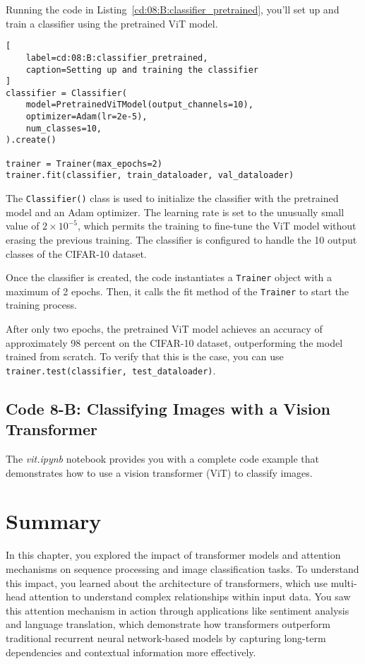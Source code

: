 Running the code in Listing~\ref{cd:08:B:classifier_pretrained}, you'll set up and train a classifier using the pretrained ViT model. 
\begin{lstlisting}[
    label=cd:08:B:classifier_pretrained,
    caption=Setting up and training the classifier
]
classifier = Classifier(
    model=PretrainedViTModel(output_channels=10),
    optimizer=Adam(lr=2e-5),
    num_classes=10,
).create()

trainer = Trainer(max_epochs=2)
trainer.fit(classifier, train_dataloader, val_dataloader)
\end{lstlisting}
The \lstinline{Classifier()} class is used to initialize the classifier with the pretrained model and an Adam optimizer. 
The learning rate is set to the unusually small value of $2 \times 10^{-5}$, which permits the training to fine-tune the ViT model without erasing the previous training. The classifier is configured to handle the 10 output classes of the CIFAR-10 dataset.

Once the classifier is created, the code instantiates a \lstinline{Trainer} object with a maximum of 2 epochs. Then, it calls the fit method of the \lstinline{Trainer} to start the training process.

After only two epochs, the pretrained ViT model achieves an accuracy of approximately 98 percent on the CIFAR-10 dataset, outperforming the model trained from scratch. To verify that this is the case, you can use \lstinline{trainer.test(classifier, test_dataloader)}.

\subsection{Code 8-B: Classifying Images with a Vision Transformer}

The \emph{vit.ipynb} notebook provides you with a complete code example that demonstrates how to use a vision transformer (ViT) to classify images.

\section{Summary}

In this chapter, you explored the impact of transformer models and attention mechanisms on sequence processing and image classification tasks. To understand this impact, you learned about the architecture of transformers, which use multi-head attention to understand complex relationships within input data. You saw this attention mechanism in action  through applications like sentiment analysis and language translation, which demonstrate how transformers outperform traditional recurrent neural network-based models by capturing long-term dependencies and contextual information more effectively.

